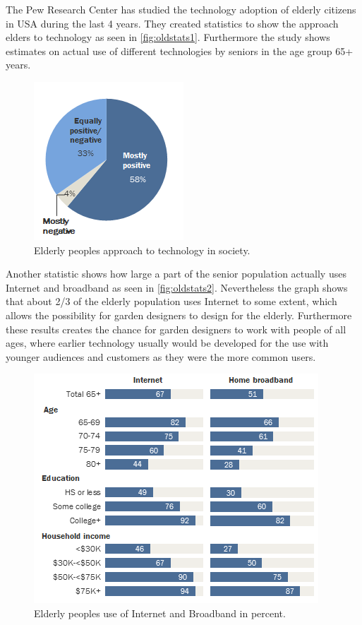 		The Pew Research Center has studied the technology adoption of elderly citizens in USA during the last 4 years. They created statistics \cite{seniorTechnology} to show the approach elders to technology as seen in \autoref {fig:oldstats1}. Furthermore the study shows estimates on actual use of different technologies by seniors in the age group 65+ years.
			\begin{figure}[H]
			\centering
			\includegraphics[width=0.4\linewidth]{figure/Analysis/oldpeoplestats1}
			\caption{Elderly peoples approach to technology in society.}
			\label{fig:oldstats1}
			\end{figure} 
		Another statistic shows how large a part of the senior population actually uses Internet and broadband as seen in \autoref{fig:oldstats2}. Nevertheless the graph shows that about 2/3 of the elderly population uses Internet to some extent, which allows the possibility for garden designers to design for the elderly. Furthermore these results creates the chance for garden designers to work with people of all ages, where earlier technology usually would be developed for the use with younger audiences and customers as they were the more common users.
			\begin{figure}[H]
			\centering
			\includegraphics[width=0.6\linewidth]{figure/Analysis/oldpeoplestats2}
			\caption{Elderly peoples use of Internet and Broadband in percent.}
			\label{fig:oldstats2}
		\end{figure} 
		
